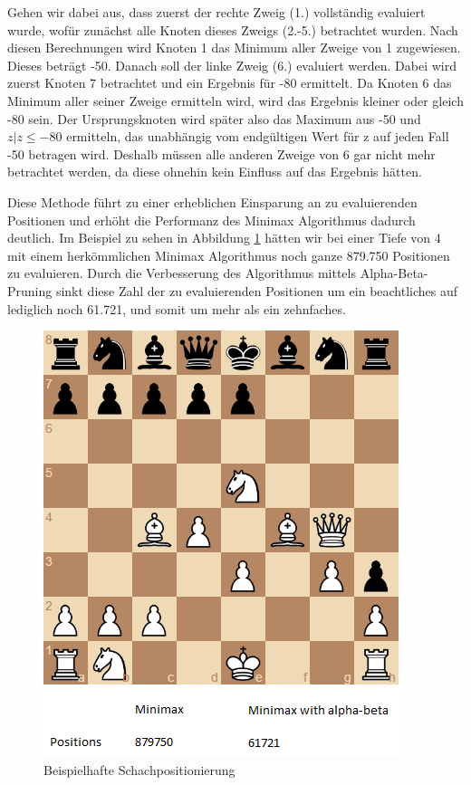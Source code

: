 Gehen wir dabei aus, dass zuerst der rechte Zweig (1.) vollständig evaluiert wurde, wofür zunächst alle Knoten dieses Zweigs (2.-5.) betrachtet wurden. Nach diesen Berechnungen wird Knoten 1 das Minimum aller Zweige von 1 zugewiesen. Dieses beträgt -50. Danach soll der linke Zweig (6.) evaluiert werden. Dabei wird zuerst Knoten 7 betrachtet und ein Ergebnis für -80 ermittelt. Da Knoten 6 das Minimum aller seiner Zweige ermitteln wird, wird das Ergebnis kleiner oder gleich -80 sein. Der Ursprungsknoten wird später also das Maximum aus -50 und $z | z \leq -80$ ermitteln, das unabhängig vom endgültigen Wert für z auf jeden Fall -50 betragen wird. Deshalb müssen alle anderen Zweige von 6 gar nicht mehr betrachtet werden, da diese ohnehin kein Einfluss auf das Ergebnis hätten.

Diese Methode führt zu einer erheblichen Einsparung an zu evaluierenden Positionen und erhöht die Performanz des Minimax Algorithmus dadurch deutlich. Im Beispiel zu sehen in Abbildung \ref{fig:chess_example} hätten wir bei einer Tiefe von 4 mit einem herkömmlichen Minimax Algorithmus noch ganze 879.750 Positionen zu evaluieren. Durch die Verbesserung des Algorithmus mittels Alpha-Beta-Pruning sinkt diese Zahl der zu evaluierenden Positionen um ein beachtliches auf lediglich noch 61.721, und somit um mehr als ein zehnfaches. \cite{Hartikka}

\begin{figure}[h]
\centering
\includegraphics[width=\textwidth/2]{images/alpha-beta-example.png}

\caption{Beispielhafte Schachpositionierung \cite{Hartikka}}\label{fig:chess_example}
\end{figure}

